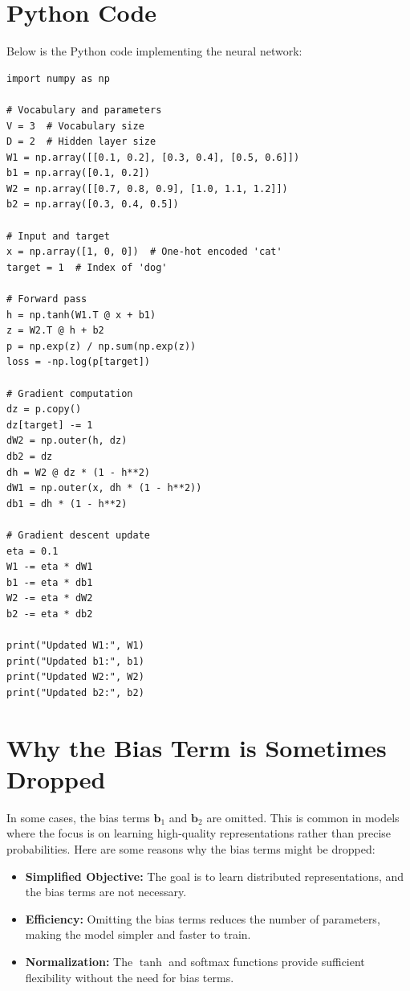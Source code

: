 \begin{notechapter}
\section{Python Code}
Below is the Python code implementing the neural network:

\begin{verbatim}
import numpy as np

# Vocabulary and parameters
V = 3  # Vocabulary size
D = 2  # Hidden layer size
W1 = np.array([[0.1, 0.2], [0.3, 0.4], [0.5, 0.6]])
b1 = np.array([0.1, 0.2])
W2 = np.array([[0.7, 0.8, 0.9], [1.0, 1.1, 1.2]])
b2 = np.array([0.3, 0.4, 0.5])

# Input and target
x = np.array([1, 0, 0])  # One-hot encoded 'cat'
target = 1  # Index of 'dog'

# Forward pass
h = np.tanh(W1.T @ x + b1)
z = W2.T @ h + b2
p = np.exp(z) / np.sum(np.exp(z))
loss = -np.log(p[target])

# Gradient computation
dz = p.copy()
dz[target] -= 1
dW2 = np.outer(h, dz)
db2 = dz
dh = W2 @ dz * (1 - h**2)
dW1 = np.outer(x, dh * (1 - h**2))
db1 = dh * (1 - h**2)

# Gradient descent update
eta = 0.1
W1 -= eta * dW1
b1 -= eta * db1
W2 -= eta * dW2
b2 -= eta * db2

print("Updated W1:", W1)
print("Updated b1:", b1)
print("Updated W2:", W2)
print("Updated b2:", b2)
\end{verbatim}

\section{Why the Bias Term is Sometimes Dropped}
In some cases, the bias terms \(\mathbf{b}_1\) and \(\mathbf{b}_2\) are omitted.
This is common in models where the focus is on learning high-quality
representations rather than precise probabilities. Here are some reasons why
the bias terms might be dropped:

\begin{itemize}
    \item \textbf{Simplified Objective:} The goal is to learn distributed
          representations, and the bias terms are not necessary.
    \item \textbf{Efficiency:} Omitting the bias terms reduces the number of
          parameters, making the model simpler and faster to train.
    \item \textbf{Normalization:} The \(\tanh\) and softmax functions provide
          sufficient flexibility without the need for bias terms.
\end{itemize}
\end{notechapter}
